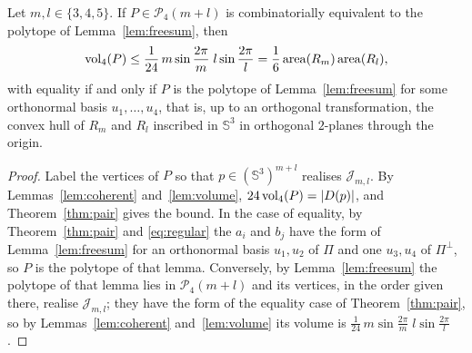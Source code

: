 \begin{corollary}
  \label{cor:pair}
  Let $m, l \in \{3, 4, 5\}$. If $P \in \mathcal{P}_{4}(m+l)$ is
  combinatorially equivalent to the polytope of Lemma~\ref{lem:freesum}, then
  \[
    \operatorname{vol}_{4}(P) \leq \frac{1}{24}\, m\sin\frac{2\pi}{m}\; l\sin\frac{2\pi}{l}
      = \frac{1}{6}\operatorname{area}(R_{m})\operatorname{area}(R_{l}),
  \]
  with equality if and only if $P$ is the polytope of Lemma~\ref{lem:freesum}
  for some orthonormal basis $u_{1}, \ldots, u_{4}$, that is, up to an
  orthogonal transformation, the convex hull of $R_{m}$ and $R_{l}$ inscribed
  in $\mathbb{S}^{3}$ in orthogonal $2$-planes through the origin.
\end{corollary}

\begin{proof}
  Label the vertices of $P$ so that $p \in (\mathbb{S}^{3})^{m+l}$ realises
  $\mathcal{J}_{m,l}$. By Lemmas~\ref{lem:coherent} and~\ref{lem:volume},
  $24\operatorname{vol}_{4}(P) = |D(p)|$, and Theorem~\ref{thm:pair} gives the bound. In the
  case of equality, by Theorem~\ref{thm:pair} and \eqref{eq:regular} the
  $a_{i}$ and $b_{j}$ have the form of Lemma~\ref{lem:freesum} for an
  orthonormal basis $u_{1}, u_{2}$ of $\Pi$ and one $u_{3}, u_{4}$ of
  $\Pi^{\perp}$, so $P$ is the polytope of that lemma. Conversely, by
  Lemma~\ref{lem:freesum} the polytope of that lemma lies in
  $\mathcal{P}_{4}(m+l)$ and its vertices, in the order given there, realise
  $\mathcal{J}_{m,l}$; they have the form of the equality case of
  Theorem~\ref{thm:pair}, so by Lemmas~\ref{lem:coherent}
  and~\ref{lem:volume} its volume is
  $\frac{1}{24}\, m\sin\frac{2\pi}{m}\; l\sin\frac{2\pi}{l}$.
\end{proof}
